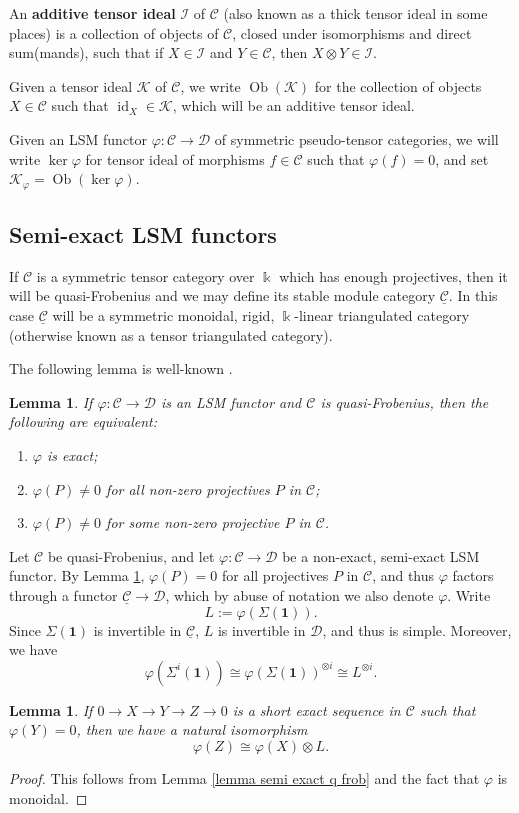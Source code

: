 \documentclass[11pt]{amsart}
\def\ker{\operatorname{ker}}
\def\KK{\mathcal{K}}
\def\Cs{\mathcal{C}}
\def\II{\mathcal{I}}
\def\Cs{\mathscr{C}}
\def\Ds{\mathscr{D}}
\def\ul{\underline}
\newtheorem{lemma}[thm]{Lemma}
\theoremstyle{definition}
\theoremstyle{remark}
\numberwithin{equation}{section}
\begin{document}
An \textbf{additive tensor ideal} $\II$ of $\Cs$ (also known as a thick tensor ideal in some places) is a collection of objects of $\Cs$, closed under isomorphisms and direct sum(mands), such that if $X\in\II$ and $Y\in\Cs$, then $X\otimes Y\in\II$.

Given a tensor ideal $\KK$ of $\Cs$, we write $\operatorname{Ob}(\KK)$ for the collection of objects $X\in\Cs$ such that $\operatorname{id}_X\in\KK$, which will be an additive tensor ideal. 

Given an LSM functor $\varphi:\Cs\to\Ds$ of symmetric pseudo-tensor categories, we will write $\ker\varphi$ for tensor ideal of morphisms $f\in\Cs$ such that $\varphi(f)=0$, and set $\KK_{\varphi}=\operatorname{Ob}(\ker \varphi)$.  

\subsection{Semi-exact LSM functors}

If $\Cs$ is a symmetric tensor category over $\Bbbk$ which has enough projectives, then it will be quasi-Frobenius and we may define its stable module category $\ul{\Cs}$.  In this case $\ul{\Cs}$ will be a symmetric monoidal, rigid, $\Bbbk$-linear triangulated category (otherwise known as a tensor triangulated category).  


The following lemma is well-known \cite[Lem.~2.2.2]{CF}.
\begin{lemma}\label{lemma exactness projs}
    If $\varphi:\Cs\to\Ds$ is an LSM functor and $\Cs$ is quasi-Frobenius, then the following are equivalent:
    \begin{enumerate}
        \item $\varphi$ is exact;
        \item $\varphi(P)\neq0$ for all non-zero projectives $P$ in $\Cs$;
        \item $\varphi(P)\neq0$ for some non-zero projective $P$ in $\Cs$.
    \end{enumerate}
\end{lemma}

Let $\Cs$ be quasi-Frobenius, and let $\varphi:\Cs\to\Ds$ be a non-exact, semi-exact LSM functor.  By Lemma \ref{lemma exactness projs}, $\varphi(P)=0$ for all projectives $P$ in $\Cs$, and thus $\varphi$ factors through a functor $\ul{\Cs}\to\Ds$, which by abuse of notation we also denote $\varphi$.  Write 
\[
L:=\varphi(\Sigma(\mathbf{1})).
\]
Since $\Sigma(\mathbf{1})$ is invertible in $\ul{\Cs}$, $L$ is invertible in $\Ds$, and thus is simple.  Moreover, we have 
\[
\varphi(\Sigma^i(\mathbf{1}))\cong\varphi(\Sigma(\mathbf{1}))^{\otimes i}\cong L^{\otimes i}.
\]
\begin{lemma}
    If $0\to X\to Y\to Z\to 0$ is a short exact sequence in $\Cs$ such that $\varphi(Y)=0$, then we have a natural isomorphism
    \[
    \varphi(Z)\cong\varphi(X)\otimes L.
    \]
\end{lemma}
\begin{proof}
    This follows from Lemma \ref{lemma semi exact q frob} and the fact that $\varphi$ is monoidal.
\end{proof}
\end{document}
